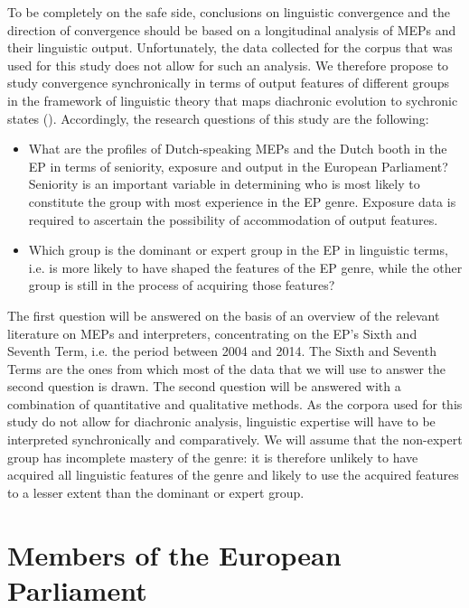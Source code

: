 \documentclass[output=paper]{langscibook}
\begin{document}
To be completely on the safe side, conclusions on linguistic convergence and the direction of convergence should be based on a longitudinal analysis of MEPs and their linguistic output. Unfortunately, the data collected for the corpus that was used for this study does not allow for such an analysis. We therefore propose to study convergence synchronically in terms of output features of different groups in the framework of linguistic theory that maps diachronic evolution to sychronic states (). Accordingly, the research questions of this study are the following:

\begin{itemize}
\item What are the profiles of Dutch-speaking MEPs and the Dutch booth in the EP in terms of seniority, exposure and output in the European Parliament? Seniority is an important variable in determining who is most likely to constitute the group with most experience in the EP genre. Exposure data is required to ascertain the possibility of accommodation of output features.
\item Which group is the dominant or expert group in the EP in linguistic terms, i.e. is more likely to have shaped the features of the EP genre, while the other group is still in the process of acquiring those features?
\end{itemize}

The first question will be answered on the basis of an overview of the relevant literature on MEPs and interpreters, concentrating on the EP’s Sixth and Seventh Term, i.e. the period between 2004 and 2014. The Sixth and Seventh Terms are the ones from which most of the data that we will use to answer the second question is drawn. The second question will be answered with a combination of quantitative and qualitative methods. As the corpora used for this study do not allow for diachronic analysis, linguistic expertise will have to be interpreted synchronically and comparatively. We will assume that the non-expert group has incomplete mastery of the genre: it is therefore unlikely to have acquired all linguistic features of the genre and likely to use the acquired features to a lesser extent than the dominant or expert group. 

\section{Members of the European Parliament} \label{sec:defrancq:3}
\end{document}
